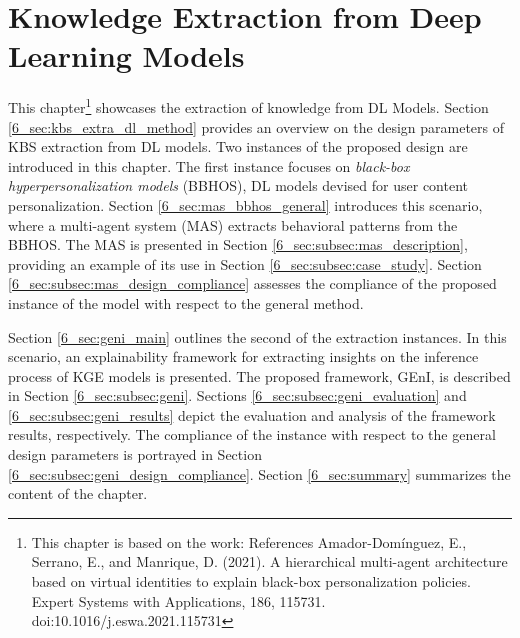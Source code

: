 \chapter{Knowledge Extraction from Deep Learning Models}
\label{chap:kbsextractiondl}
This chapter\footnote{This chapter is based on the work: References
Amador-Domínguez, E., Serrano, E., and Manrique, D. (2021). A hierarchical multi-agent architecture based on virtual identities to explain black-box personalization policies. Expert Systems with Applications, 186, 115731. doi:10.1016/j.eswa.2021.115731} showcases the extraction of knowledge from DL Models. Section \ref{6_sec:kbs_extra_dl_method} provides an overview on the design parameters of KBS extraction from DL models. Two instances of the proposed design are introduced in this chapter. The first instance focuses on \textit{black-box hyperpersonalization models} (BBHOS), DL models devised for user content personalization. Section \ref{6_sec:mas_bbhos_general} introduces this scenario, where a multi-agent system (MAS) extracts behavioral patterns from the BBHOS. The MAS is presented in Section \ref{6_sec:subsec:mas_description}, providing an example of its use in Section \ref{6_sec:subsec:case_study}. Section \ref{6_sec:subsec:mas_design_compliance} assesses the compliance of the proposed instance of the model with respect to the general method. 

Section \ref{6_sec:geni_main} outlines the second of the extraction instances. In this scenario, an explainability framework for extracting insights on the inference process of KGE models is presented. The proposed framework, GEnI, is described in Section \ref{6_sec:subsec:geni}. Sections \ref{6_sec:subsec:geni_evaluation} and \ref{6_sec:subsec:geni_results} depict the evaluation and analysis of the framework results, respectively. The compliance of the instance with respect to the general design parameters is portrayed in Section \ref{6_sec:subsec:geni_design_compliance}. Section \ref{6_sec:summary} summarizes the content of the chapter.



